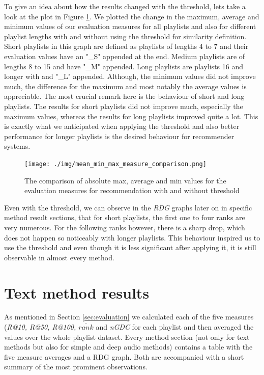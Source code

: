 To give an idea about how the results changed with the threshold, lets take a look at the plot in Figure \ref{fig:absolute_value_comparison}. We plotted the change in the maximum, average and minimum values of our evaluation measures for all playlists and also for different playlist lengths with and without using the threshold for similarity definition. Short playlists in this graph are defined as playlists of lengths 4 to 7 and their evaluation values have an "\_S" appended at the end. Medium playlists are of lengths 8 to 15 and have "\_M" appended. Long playlists are playlists 16 and longer with and "\_L" appended. Although, the minimum values did not improve much, the difference for the maximum and most notably the average values is appreciable. The most crucial remark here is the behaviour of short and long playlists. The results for short playlists did not improve much, especially the maximum values, whereas the results for long playlists improved quite a lot. This is exactly what we anticipated when applying the threshold and also better performance for longer playlists is the desired behaviour for recommender systems.

\begin{figure}[h]
    \centering
	\texttt{[image: ./img/mean\_min\_max\_measure\_comparison.png]}
	\caption{The comparison of absolute max, average and min values for the evaluation measures for recommendation with and without threshold}
	\label{fig:absolute_value_comparison}
\end{figure}

Even with the threshold, we can observe in the \textit{RDG} graphs later on in specific method result sections, that for short playlists, the first one to four ranks are very numerous. For the following ranks however, there is a sharp drop, which does not happen so noticeably with longer playlists. This behaviour inspired us to use the threshold and even though it is less significant after applying it, it is still observable in almost every method.




\section{Text method results}\label{sec:text_results}

As mentioned in Section \ref{sec:evaluation} we calculated each of the five measures (\textit{R@10, R@50, R@100, $ {\overline{rank}} $} and \textit{nGDC} for each playlist and then averaged the values over the whole playlist dataset. Every method section (not only for text methods but also for simple and deep audio methods) contains a table with the five measure averages and a RDG graph. Both are accompanied with a short summary of the most prominent observations.

